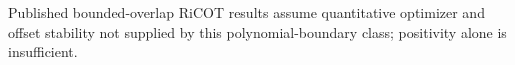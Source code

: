 Published bounded-overlap RiCOT results assume quantitative optimizer and offset stability not supplied by this polynomial-boundary class; positivity alone is insufficient.